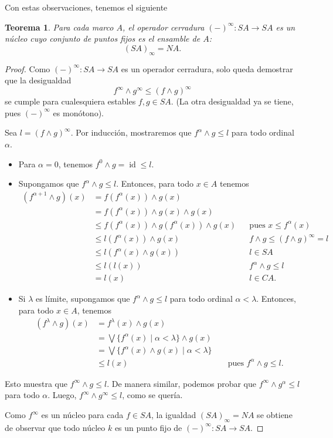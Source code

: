 \documentclass[12pt,letterpaper,titlepage]{article}
\newtheorem*{thm}{Teorema}
\theoremstyle{definition}
\newcommand\Sup{\bigvee}
\renewcommand\inf{\wedge}
\newcommand\<{\langle}
\renewcommand\>{\rangle}
\DeclareMathOperator{\id}{id}
\begin{document}
Con estas observaciones, tenemos el siguiente
\begin{thm}
  Para cada marco $A$, el operador cerradura $({-})^\infty:SA\to
  SA$ es un núcleo cuyo conjunto de puntos fijos es el ensamble
  de $A$:
  \[
    (SA)_\infty = NA
  .\]
\end{thm}
\begin{proof}
  Como $({-})^\infty:SA\to SA$ es un operador cerradura,
  solo queda demostrar que la desigualdad
  \[
    f^\infty \inf g^\infty \leq (f\inf g)^\infty
  \]
  se cumple para cualesquiera estables $f,g\in SA$.
  (La otra desigualdad ya se tiene, pues $({-})^\infty$ es monótono).

  Sea $l=(f \inf g)^\infty$.
  Por inducción, mostraremos que $f^\alpha\inf g\leq l$ para todo
  ordinal $\alpha$.
  \begin{itemize}
    \item Para $\alpha=0$, tenemos $f^0\inf g=\id \leq l$.
    \item Supongamos que $f^\alpha\inf g\leq l$.
    Entonces, para todo $x\in A$ tenemos
    \begin{align*}
      (f^{\alpha+1}\inf g)(x)
      &= f(f^\alpha(x)) \inf g(x) \\
      &= f(f^\alpha(x)) \inf g(x) \inf g(x) \\
      &\leq f(f^\alpha(x)) \inf g(f^\alpha(x)) \inf g(x)
        && \text{pues } x\leq f^\alpha(x) \\
      &\leq l(f^\alpha(x)) \inf g(x) && f\inf g\leq (f\inf
      g)^\infty =l \\
      &\leq l(f^\alpha(x) \inf g(x)) && l\in SA \\
      &\leq l(l(x)) && f^\alpha\inf g\leq l \\
      &= l(x) && l\in CA.
    \end{align*}
    \item
    Si $\lambda$ es límite, supongamos que $f^\alpha\inf g\leq l$
    para todo ordinal $\alpha <\lambda$.
    Entonces, para todo $x\in A$, tenemos
    \begin{align*}
      (f^\lambda\inf g)(x)
      &= f^\lambda(x) \inf g(x) \\
      &= \Sup\{f^\alpha(x) \mid \alpha<\lambda\} \inf g(x) \\
      &= \Sup\{f^\alpha(x)\inf g(x) \mid \alpha<\lambda\} \\
      &\leq l(x) && \text{ pues } f^\alpha\inf g\leq l.
    \end{align*}
  \end{itemize}
  Esto muestra que $f^\infty \inf g\leq l$.
  De manera similar, podemos probar que $f^\infty \inf
  g^\alpha\leq l$ para todo $\alpha$.
  Luego, $f^\infty \inf g^\infty \leq l$, como se quería.

  Como $f^\infty$ es un núcleo para cada $f\in SA$, la
  igualdad $(SA)_\infty=NA$ se obtiene de observar que todo
  núcleo $k$ es un punto fijo de $({-})^\infty:SA\to SA$.
\end{proof}
\end{document}
